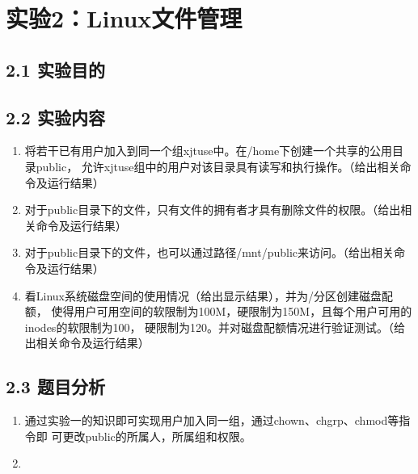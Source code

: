 \vspace{-3cm}\chapter{实验2：Linux文件管理}

\section{2.1 实验目的}


\section{2.2 实验内容}

\begin{enumerate}
    \item 将若干已有用户加入到同一个组xjtuse中。在/home下创建一个共享的公用目录public，
        允许xjtuse组中的用户对该目录具有读写和执行操作。（给出相关命令及运行结果）
    \item 对于public目录下的文件，只有文件的拥有者才具有删除文件的权限。（给出相关命令及运行结果）
    \item 对于public目录下的文件，也可以通过路径/mnt/public来访问。（给出相关命令及运行结果）
    \item 看Linux系统磁盘空间的使用情况（给出显示结果），并为/分区创建磁盘配额，
        使得用户可用空间的软限制为100M，硬限制为150M，且每个用户可用的inodes的软限制为100，
        硬限制为120。并对磁盘配额情况进行验证测试。（给出相关命令及运行结果）
\end{enumerate}

\section{2.3 题目分析}

\begin{enumerate}
    \item 通过实验一的知识即可实现用户加入同一组，通过chown、chgrp、chmod等指令即
        可更改public的所属人，所属组和权限。
    \item 
\end{enumerate}



